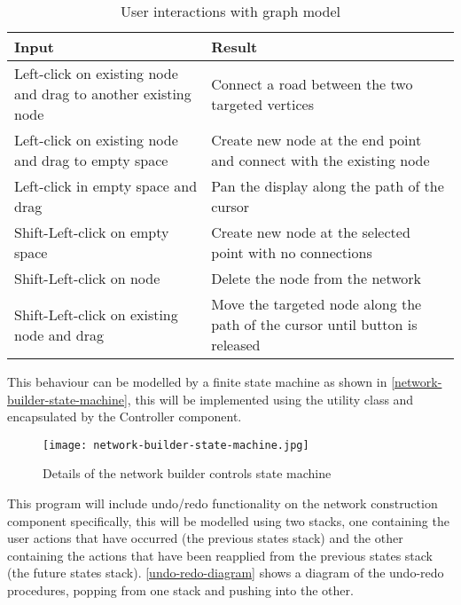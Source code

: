     \begin{table}
        \centering
        \begin{tabular}{|p{}|p{}|}
            \hline
            \textbf{Input} & \textbf{Result}\\
            \hline
            Left-click on existing node and drag to another existing node & Connect a road between the two targeted vertices\\\hline
            Left-click on existing node and drag to empty space & Create new node at the end point and connect with the existing node\\\hline
            Left-click in empty space and drag & Pan the display along the path of the cursor\\\hline
            Shift-Left-click on empty space & Create new node at the selected point with no connections\\\hline
            Shift-Left-click on node & Delete the node from the network\\\hline
            Shift-Left-click on existing node and drag & Move the targeted node along the path of the cursor until button is released\\\hline
        \end{tabular}
        \caption{User interactions with graph model}
        \label{user-interaction-specification}
    \end{table}

    This behaviour can be modelled by a finite state machine as shown in \autoref{network-builder-state-machine}, this will be implemented using the  utility class and encapsulated by the Controller component.

    \begin{figure}
        \centering
        \texttt{[image: network-builder-state-machine.jpg]}
        \caption{Details of the network builder controls state machine}
        \label{network-builder-state-machine}
    \end{figure}

    This program will include undo/redo functionality on the network construction component specifically, this will be modelled using two stacks, one containing the user actions that have occurred (the previous states stack) and the other containing the actions that have been reapplied from the previous states stack (the future states stack). \autoref{undo-redo-diagram} shows a diagram of the undo-redo procedures, popping from one stack and pushing into the other.

